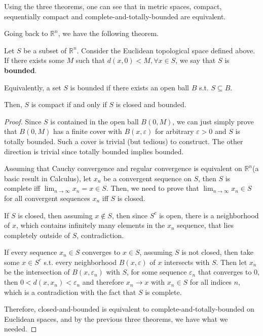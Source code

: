 Using the three theorems, one can see that in metric spaces, compact,
sequentially compact and complete-and-totally-bounded are equivalent.

Going back to \( \mathbb{R}^{n} \), we have the following theorem.

\begin{theorem}
  Let \( S \) be a subset of \( \mathbb{R}^{n} \). Consider the Euclidean
  topological space defined above. If there exists some \( M \) such that \(
  d(x, 0) < M, \forall x \in S \), we say that \( S \) is \textbf{bounded}.

  Equivalently, a set \( S \) is bounded if there exists an open ball \( B \)
  s.t. \( S \subseteq B \).

  Then, \( S \) is compact if and only if \( S \) is closed and bounded.
\end{theorem}

\begin{proof}
  Since \( S \) is contained in the open ball \( B(0, M) \), we can just simply
  prove that \( B(0, M) \) has a finite cover with \( B(x, \varepsilon) \) for
  arbitrary \( \varepsilon > 0 \) and \( S \) is totally bounded. Such a cover
  is trivial (but tedious) to construct. The other direction is trivial since
  totally bounded implies bounded.

  Assuming that Cauchy convergence and regular convergence is equivalent on \(
  \mathbb{R}^{n} \)(a basic result in Calculus), let \( x_{n} \) be a
  convergent sequence on \( S \), then \( S \) is complete iff \(  \lim_{n \to
  \infty} x_{n} =x \in S \). Then, we need to prove that \( \lim_{n \to \infty}
  x_{n} \in S\) for all convergent sequences \( x_{n} \) iff \( S \) is closed.

  If \( S \) is closed, then assuming \( x \notin S \), then since \( S^{c} \)
  is open, there is a neighborhood of \( x \), which contains infinitely many
  elements in the \( x_{n} \) sequence, that lies completely outside of \( S \),
  contradiction.

  If every sequence \( x_{n} \in S \) converges to \( x \in S \), assuming \( S
  \) is not closed, then take some \( x \in S^{c} \) s.t. every neighborhood \(
  B(x, \varepsilon)\) of \( x \)  intersects with \( S \). Then let \( x_{n} \)
  be the intersection of \( B(x, \varepsilon_{n}) \) with \( S \), for some
  sequence \( \varepsilon_{n} \) that converges to \( 0 \), then \( 0 < d(x,
  x_{n}) < \varepsilon_{n} \) and therefore \( x_{n} \to  x \) with \( x_{n} \in
  S\) for all indices \( n \), which is a contradiction with the fact that \( S
  \) is complete.

  Therefore, closed-and-bounded is equivalent to complete-and-totally-bounded on
  Euclidean spaces, and by the previous three theorems, we have what we needed.
\end{proof}

